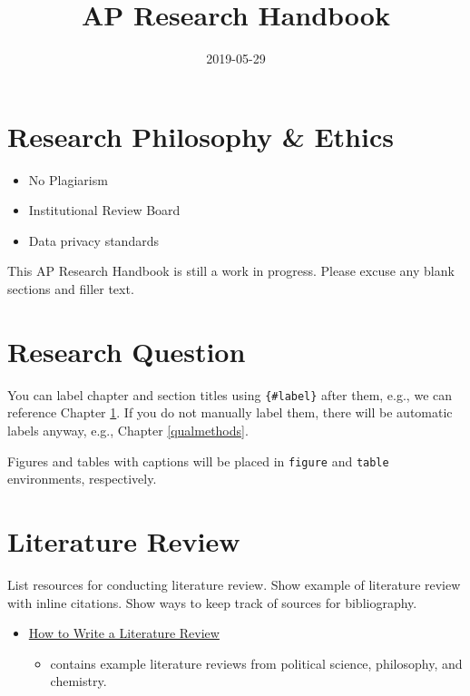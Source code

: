 \documentclass[]{book}
\title{AP Research Handbook}
\author{}
\date{2019-05-29}
\providecommand{\tightlist}{%
  \setlength{\itemsep}{0pt}\setlength{\parskip}{0pt}}
\begin{document}
\maketitle

{
\setcounter{tocdepth}{1}
\tableofcontents
}
\hypertarget{research-philosophy-ethics}{%
\chapter*{Research Philosophy \& Ethics}\label{research-philosophy-ethics}}

\begin{itemize}
\tightlist
\item
  No Plagiarism
\item
  Institutional Review Board
\item
  Data privacy standards
\end{itemize}

This AP Research Handbook is still a work in progress. Please excuse any blank sections and filler text.

\hypertarget{intro}{%
\chapter{Research Question}\label{intro}}

You can label chapter and section titles using \texttt{\{\#label\}} after them, e.g., we can reference Chapter \ref{intro}. If you do not manually label them, there will be automatic labels anyway, e.g., Chapter \ref{qualmethods}.

Figures and tables with captions will be placed in \texttt{figure} and \texttt{table} environments, respectively.

\hypertarget{literature-review}{%
\chapter{Literature Review}\label{literature-review}}

List resources for conducting literature review.
Show example of literature review with inline citations.
Show ways to keep track of sources for bibliography.

\begin{itemize}
\tightlist
\item
  \href{https://writing.wisc.edu/handbook/assignments/reviewofliterature/}{How to Write a Literature Review}

  \begin{itemize}
  \tightlist
  \item
    contains example literature reviews from political science, philosophy, and chemistry.
  \end{itemize}
\end{itemize}
\end{document}
